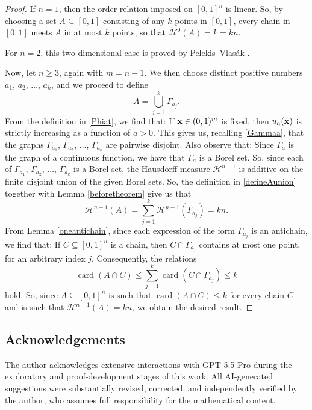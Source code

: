 \documentclass[10pt,a4paper]{amsart}
\begin{document}
\begin{proof}
 If $n = 1$, then the order relation imposed on $[0, 1]^{n}$ is linear. So, by choosing a set $A \subseteq [0, 1]$ consisting of any $k$ points in $[0, 1]$, every chain in $[0, 1]$ meets $A$ 
 in at most $k$ points, so that $\mathcal{H}^{0}(A) = k = k n$.

 For $n = 2$, this two-dimensional case is proved by Pelekis--Vlas\'ak \cite{PelekisVlasak2020}.

 Now, let $n \geq 3$, again with $m = n - 1$. We then choose distinct positive numbers $a_1$, $a_2$, $\ldots$, $a_k$, and we proceed to define 
\begin{equation}\label{defineAunion}
 A = \bigcup_{j=1}^{k} \Gamma_{a_{j}}. 
\end{equation}
 From the definition in \eqref{Phiat}, we find that: If $\text{{\bf x}} \in (0, 1)^{m}$ is fixed, then $u_{a}(\text{{\bf x}})$ is strictly increasing as a function of $a > 0$. This gives us, 
 recalling \eqref{Gammaa}, that the graphs $\Gamma_{a_{1}}$, $\Gamma_{a_{2}}$, $\ldots$, $\Gamma_{a_{k}}$ are pairwise disjoint. Also observe that: Since $\Gamma_a$ is the graph 
 of a continuous function, we have that $\Gamma_a$ is a Borel set. So, since each of $\Gamma_{a_{1}}$, $\Gamma_{a_{2}}$, $\ldots$, $\Gamma_{a_{k}}$ is a Borel set, the Hausdorff 
 measure $\mathcal{H}^{n-1}$ is additive on the finite disjoint union of the given Borel sets. So, the definition in \eqref{defineAunion} together with Lemma \ref{beforetheorem} give 
 us that $$\mathcal{H}^{n-1}(A) = \sum_{j=1}^{k} \mathcal{H}^{n-1}(\Gamma_{a_{j}}) = k n.$$ From Lemma \ref{oneantichain}, since each expression of the form $\Gamma_{a_{j}}$ 
 is an antichain, we find that: If $C \subseteq [0, 1]^{n}$ is a chain, then $C \cap \Gamma_{a_{j}}$
 contains at most one point, for an arbitrary index $j$. Consequently, the relations
 $$ \operatorname{card}(A \cap C) \leq \sum_{j=1}^{k} \operatorname{card}(C \cap \Gamma_{a_{j}}) \leq k $$
 hold. So, since $A \subseteq [0, 1]^{n}$ is such that 
 $\operatorname{card}(A \cap C) \leq k$ for every chain $C$
 and is such that $\mathcal{H}^{n-1}(A) = k n$, we obtain the desired result. 
 \end{proof}


\subsection*{Acknowledgements}
 The author acknowledges extensive interactions with GPT-5.5 Pro during the exploratory and proof-development stages of this work. All AI-generated suggestions were 
 substantially revised, corrected, and independently verified by the author, who assumes full responsibility for the mathematical content.
\end{document}
